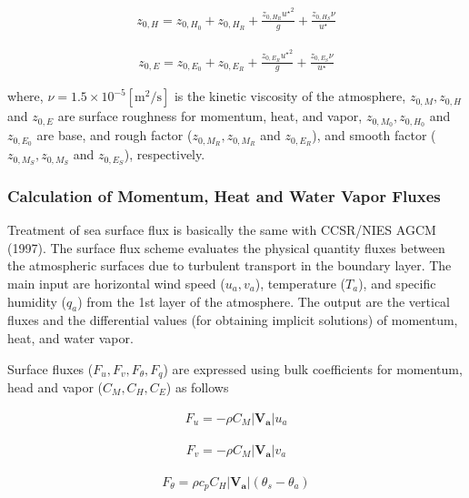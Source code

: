 \begin{eqnarray}
    z_{0,H} = z_{0,H_0} + z_{0,H_R} + \frac{z_{0,H_R} {u^\star }^2 }{g} + \frac{z_{0,H_S}\nu }{u^\star}
\end{eqnarray}

\begin{eqnarray}
    z_{0,E} = z_{0,E_0} + z_{0,E_R} + \frac{z_{0,E_R} {u^\star }^2 }{g} + \frac{z_{0,E_S}\nu }{u^\star}
\end{eqnarray}

where, \(\nu = 1.5 \times 10^{-5} \mathrm{[m^2/s]}\) is the kinetic viscosity of the atmosphere, \(z_{0,M},z_{0,H}\) and \(z_{0,E}\) are surface roughness for momentum, heat, and vapor,
\(z_{0,M_0},z_{0,H_0}\) and \(z_{0,E_0}\) are base, and rough factor (\(z_{0,M_R},z_{0,M_R}\) and \(z_{0,E_R}\)), and smooth factor (\(z_{0,M_S},z_{0,M_S}\) and \(z_{0,E_S}\)), respectively.

\hypertarget{calculation-of-momentum-heat-and-water-vapor-fluxes}{%
\subsubsection{Calculation of Momentum, Heat and Water Vapor Fluxes}\label{calculation-of-momentum-heat-and-water-vapor-fluxes}}

Treatment of sea surface flux is basically the same with CCSR/NIES AGCM (1997). The surface flux scheme evaluates the physical quantity fluxes between the atmospheric surfaces due to turbulent
transport in the boundary layer. The main input are horizontal wind speed (\(u_a, v_a\)), temperature (\(T_a\)), and specific humidity (\(q_a\)) from the 1st layer of the atmosphere. The output are
the vertical fluxes and the differential values (for obtaining implicit solutions) of momentum, heat, and water vapor.

Surface fluxes (\(F_u, F_v, F_\theta, F_q\)) are expressed using bulk coefficients for momentum, head and vapor (\(C_M, C_H, C_E\)) as follows

\begin{eqnarray}
    F_u  =  - \rho C_M |\mathbf{V_a}| u_a
\end{eqnarray}

\begin{eqnarray}
    F_v  =  - \rho C_M |\mathbf{V_a}| v_a
\end{eqnarray}

\begin{eqnarray}
    F_\theta  = \rho c_p C_H |\mathbf{V_a}| ( \theta_s - \theta_a )
\end{eqnarray}

